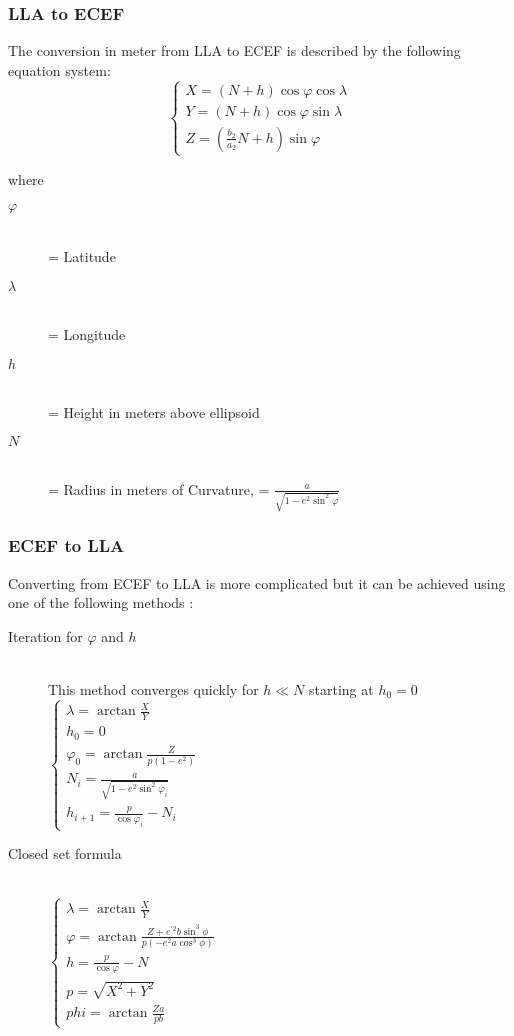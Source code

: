 \subsubsection{LLA to ECEF}
The conversion in meter from LLA to ECEF is described by the following equation
system:
\begin{equation}
\begin{cases} 
X = (N+h)\cos \varphi \cos \lambda
\\ Y = (N+h)\cos \varphi \sin \lambda
\\ Z = (\frac{b_{2}}{a_{2}}N + h) \sin \varphi
\end{cases}
\end{equation}

where

\begin {description}
\item [$\varphi$] \hfill \\ = Latitude
\item [$\lambda$] \hfill \\= Longitude
\item [$h$] \hfill \\= Height in meters above ellipsoid
\item [$N$] \hfill \\= Radius in meters of Curvature,  = $\frac{a}{\sqrt{1-e^{2} \sin^{2} \varphi}}$
\end{description}

\subsubsection{ECEF to LLA}
Converting from ECEF to LLA is more complicated but it can be achieved  using one
of the following methods \cite{datum}:

\begin{description}
\item [Iteration for $\varphi$ and $h$] \hfill \\
This method converges quickly for  $h \ll N$ starting at $h_{0}=0$
\newline
$
\begin{cases}
\lambda = \arctan \frac{X}{Y}
\\ h_{0} = 0
\\ \varphi_{0} = \arctan \frac{Z}{p(1-e^{2})}
\\ N_{i}  = \frac{a} {\sqrt{1-e^{2}\sin^{2} \varphi_{i}}}
\\ h_{i+1} = \frac{p}{\cos \varphi_{i}} - N_{i}
\end{cases}
$
\item [Closed set formula] \hfill \\
$
\begin{cases}
\lambda = \arctan \frac{X}{Y}
\\ \varphi = \arctan \frac{Z + e^{'2}b\sin^{3} \phi}{p(-e^{2}a\cos^3 \phi)}
\\ h = \frac{p}{\cos \varphi} - N
\\ p = \sqrt{X^{2} + Y^{2}}
\\ phi = \arctan \frac{Za}{pb}
\end{cases}
$
\end{description}

